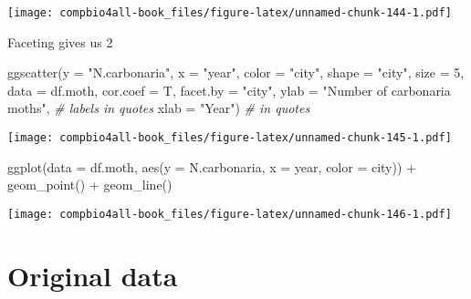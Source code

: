 \documentclass[
]{book}
\newenvironment{Shaded}{\begin{snugshade}}{\end{snugshade}}
\newcommand{\AttributeTok}[1]{\textcolor[rgb]{0.77,0.63,0.00}{#1}}
\newcommand{\CommentTok}[1]{\textcolor[rgb]{0.56,0.35,0.01}{\textit{#1}}}
\newcommand{\DecValTok}[1]{\textcolor[rgb]{0.00,0.00,0.81}{#1}}
\newcommand{\FunctionTok}[1]{\textcolor[rgb]{0.00,0.00,0.00}{#1}}
\newcommand{\NormalTok}[1]{#1}
\newcommand{\SpecialCharTok}[1]{\textcolor[rgb]{0.00,0.00,0.00}{#1}}
\newcommand{\StringTok}[1]{\textcolor[rgb]{0.31,0.60,0.02}{#1}}
\begin{document}
\texttt{[image: compbio4all-book\_files/figure-latex/unnamed-chunk-144-1.pdf]}

Faceting gives us 2

\begin{Shaded}
\begin{Highlighting}[]
\FunctionTok{ggscatter}\NormalTok{(}\AttributeTok{y =} \StringTok{"N.carbonaria"}\NormalTok{,}
          \AttributeTok{x =} \StringTok{"year"}\NormalTok{,}
          \AttributeTok{color =} \StringTok{"city"}\NormalTok{,}
          \AttributeTok{shape =} \StringTok{"city"}\NormalTok{,}
          \AttributeTok{size =} \DecValTok{5}\NormalTok{,       }
          \AttributeTok{data =}\NormalTok{ df.moth,}
          \AttributeTok{cor.coef =}\NormalTok{ T,}
          \AttributeTok{facet.by =} \StringTok{"city"}\NormalTok{,}
          \AttributeTok{ylab =} \StringTok{"Number of carbonaria moths"}\NormalTok{, }\CommentTok{\# labels in quotes}
          \AttributeTok{xlab =} \StringTok{"Year"}\NormalTok{)   }\CommentTok{\# in quotes}
\end{Highlighting}
\end{Shaded}

\texttt{[image: compbio4all-book\_files/figure-latex/unnamed-chunk-145-1.pdf]}

\begin{Shaded}
\begin{Highlighting}[]
\FunctionTok{ggplot}\NormalTok{(}\AttributeTok{data =}\NormalTok{ df.moth,}
        \FunctionTok{aes}\NormalTok{(}\AttributeTok{y =}\NormalTok{ N.carbonaria,}
            \AttributeTok{x =}\NormalTok{ year,}
            \AttributeTok{color =}\NormalTok{ city)) }\SpecialCharTok{+}
  \FunctionTok{geom\_point}\NormalTok{() }\SpecialCharTok{+}
  \FunctionTok{geom\_line}\NormalTok{()}
\end{Highlighting}
\end{Shaded}

\texttt{[image: compbio4all-book\_files/figure-latex/unnamed-chunk-146-1.pdf]}

\hypertarget{original-data}{%
\section{Original data}\label{original-data}}
\end{document}

